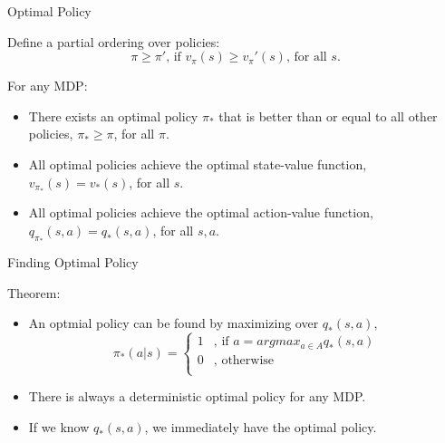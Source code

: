 \documentclass{beamer}
\begin{document}
\begin{frame}{Optimal Policy}
    \begin{exampleblock}{Define a partial ordering over policies:}
        $$
        \pi \geq \pi' \text{, if } v_\pi(s) \geq v_\pi'(s)
        \text{, for all } s.
        $$
    \end{exampleblock}

    \pause
    \begin{exampleblock}{For any MDP:}
        \begin{itemize}
            \item There exists an optimal policy $\pi_*$ that is better than or
            equal to all other policies,
            $\pi_* \geq \pi$, for all $\pi$.
            
            \item All optimal policies achieve the optimal state-value function, 
            $v_{\pi_*}(s) = v_*(s)$, for all $s$.

            \item All optimal policies achieve the optimal action-value function,
            $q_{\pi_*}(s,a) = q_*(s,a)$, for all $s, a$.
        \end{itemize}
    \end{exampleblock}
\end{frame}


\begin{frame}{Finding Optimal Policy}
\begin{exampleblock}{Theorem:}
    \begin{itemize}
        \item An optmial policy can be found by maximizing over $q_*(s,a)$,
        \[
        \pi_*(a|s) = 
        \begin{cases}
            1 & \text{, if } a = argmax_{a\in A} q_*(s, a)\\
            0 & \text{, otherwise}\\
        \end{cases}
        \]

        \item There is always a \alert{deterministic} optimal policy for any MDP.

        \item If we know $q_*(s,a)$, we immediately have the optimal policy.
    \end{itemize}
\end{exampleblock}
\end{frame}
\end{document}
